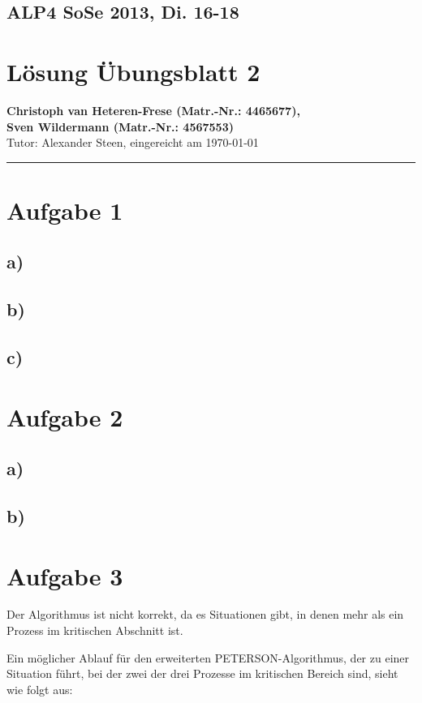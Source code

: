 \documentclass[11pt,a4paper,DIV=10,]{scrartcl}
\begin{document}
\onecolumn
\subsection*{ALP4 SoSe 2013, Di. 16-18}
\section*{Lösung Übungsblatt 2}
\textbf{Christoph van Heteren-Frese (Matr.-Nr.: 4465677), \\ Sven Wildermann (Matr.-Nr.: 4567553)}\\
Tutor: Alexander Steen, eingereicht am \today\\
\hrule

\section*{Aufgabe 1}
\subsection*{a)}
\subsection*{b)}
\subsection*{c)}
\section*{Aufgabe 2}
\subsection*{a)}
\subsection*{b)}

\section*{Aufgabe 3}
Der Algorithmus ist nicht korrekt, da es Situationen gibt, in denen mehr als ein Prozess im kritischen Abschnitt ist. 

Ein möglicher Ablauf für den erweiterten PETERSON-Algorithmus, der zu einer Situation führt, bei der zwei der drei Prozesse im kritischen Bereich sind, sieht wie folgt aus: 
\end{document}
